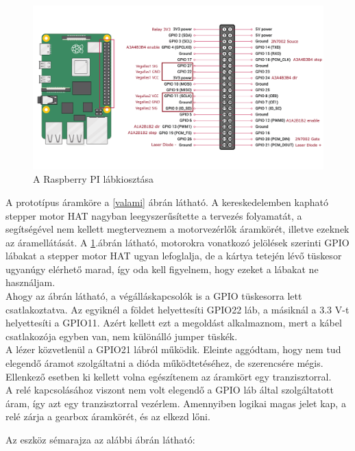 \documentclass[12pt,a4paper]{article}
\begin{document}
\begin{figure}[h!]
	\centering
	\includegraphics[width=1\linewidth]{elek_pinout}
	\caption{A Raspberry PI lábkiosztása}
	\label{fig:elek_pinout}
\end{figure}


A prototípus áramköre a \ref{valami} ábrán látható. A kereskedelemben kapható stepper motor HAT nagyban leegyszerűsítette a tervezés folyamatát, a segítségével nem kellett megterveznem a motorvezérlők áramkörét, illetve ezeknek az áramellátását. A \ref{fig:elek_pinout}.ábrán látható, motorokra vonatkozó jelölések szerinti GPIO lábakat a stepper motor HAT ugyan lefoglalja, de a kártya tetején lévő tüskesor ugyanúgy elérhető marad, így oda kell figyelnem, hogy ezeket a lábakat ne használjam. \\

Ahogy az ábrán látható, a végálláskapcsolók is a GPIO tüskesorra lett csatlakoztatva. Az egyiknél a földet helyettesíti GPIO22 láb, a másiknál a 3.3 V-t helyettesíti a GPIO11. Azért kellett ezt a megoldást alkalmaznom, mert a kábel csatlakozója egyben van, nem különálló jumper tüskék.\\

A lézer közvetlenül a GPIO21 lábról működik. Eleinte aggódtam, hogy nem tud elegendő áramot szolgáltatni a dióda működtetéséhez, de szerencsére mégis. Ellenkező esetben ki kellett volna egészítenem az áramkört egy tranzisztorral. \\

A relé kapcsolásához viszont nem volt elegendő a GPIO láb által szolgáltatott áram, így azt egy tranzisztorral vezérlem. Amennyiben logikai magas jelet kap, a relé zárja a gearbox áramkörét, és az elkezd lőni.

Az eszköz sémarajza az alábbi ábrán látható:
\end{document}
